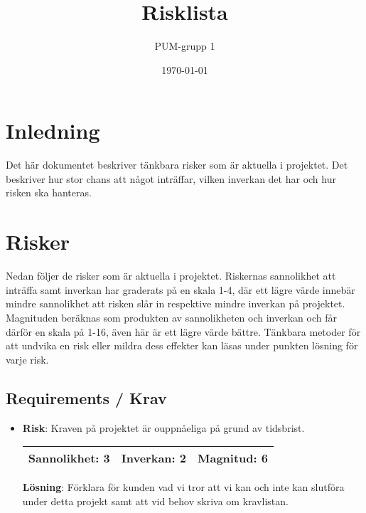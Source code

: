 

\ifpdf
\else
\fi

\title{Risklista}
\author{PUM-grupp 1}
\date{\today}



\maketitle\thispagestyle{empty}

\newpage

\setcounter{tocdepth}{2}
\newpage

\section{Inledning}
Det här dokumentet beskriver tänkbara risker som är aktuella i projektet. Det beskriver hur stor chans att något inträffar, vilken inverkan det har och hur risken ska hanteras.

\section{Risker}
Nedan följer de risker som är aktuella i projektet. Riskernas sannolikhet att inträffa samt inverkan har graderats på en skala 1-4, där ett lägre värde innebär mindre sannolikhet att risken slår in respektive mindre inverkan på projektet. Magnituden beräknas som produkten av sannolikheten och inverkan och får därför en skala på 1-16, även här är ett lägre värde bättre. Tänkbara metoder för att undvika en risk eller mildra dess effekter kan läsas under punkten lösning för varje risk.

\subsection{Requirements / Krav}
\begin{itemize}
\item \textbf{Risk}: Kraven på projektet är ouppnåeliga på grund av tidsbrist.

\begin{tabular}{ | l | l | l |}
	\hline
	Sannolikhet: 3 & Inverkan: 2 & Magnitud: 6 \\ \hline
\end{tabular}

\textbf{Lösning}: Förklara för kunden vad vi tror att vi kan och inte kan slutföra under detta projekt samt att vid behov skriva om kravlistan.
\end{itemize}


